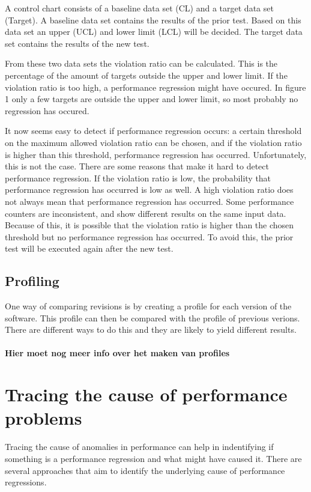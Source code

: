 A control chart consists of a baseline data set (CL) and a target data set (Target). A baseline data set contains the results of the prior test. Based on this data set an upper (UCL) and lower limit (LCL) will be decided. The target data set contains the results of the new test.

From these two data sets the violation ratio can be calculated. This is the percentage of the amount of targets outside the upper and lower limit. If the violation ratio is too high, a performance regression might have occured. In figure 1 only a few targets are outside the upper and lower limit, so most probably no regression has occured.

It now seems easy to detect if performance regression occurs: a certain threshold on the maximum allowed violation ratio can be chosen, and if the violation ratio is higher than this threshold, performance regression has occurred. Unfortunately, this is not the case. There are some reasons that make it hard to detect performance regression. If the violation ratio is low, the probability that performance regression has occurred is low as well. A high violation ratio does not always mean that performance regression has occurred. Some performance counters are inconsistent, and show different results on the same input data. Because of this, it is possible that the violation ratio is higher than the chosen threshold but no performance regression has occurred. To avoid this, the prior test will be executed again after the new test.

\subsection{Profiling}
One way of comparing revisions is by creating a profile for each version of the software. This profile can then be compared with the profile of previous verions. There are different ways to do this and they are likely to yield different results.
\\\\
\textbf{Hier moet nog meer info over het maken van profiles}

\section{Tracing the cause of performance problems}
Tracing the cause of anomalies in performance can help in indentifying if something is a performance regression and what might have caused it. There are several approaches that aim to identify the underlying cause of performance regressions.

